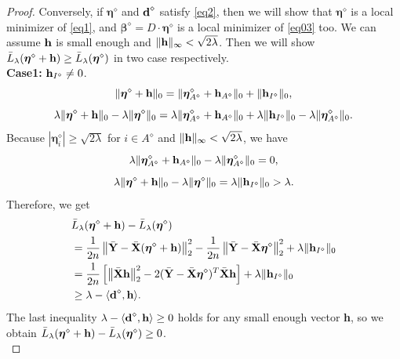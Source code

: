 \documentclass[12pt]{article}
\newcommand{\bX}{{\bf X}}
\newcommand{\bh}{\mbox{\bf h}}
\newcommand{\bd}{\mbox{\bf d}}
\newcommand{\bY}{\mbox{\bf Y}}
\newcommand{\bbeta}{\boldsymbol{\beta}}
\newcommand{\boldeta}{\boldsymbol{\eta}}
\begin{document}
\begin{appendix}
\begin{proof}
Conversely, if $\boldeta^{\diamond}$ and $\bd^{\diamond}$ satisfy \eqref{eq2}, then we will show that $\boldeta^{\diamond}$ is a local minimizer of \eqref{eq1}, and $\bbeta^{\diamond}=D\cdot\boldeta^{\diamond}$ is a local minimizer of \eqref{eq03} too.
We can assume $\bh$ is small enough and $\|\bh\|_{\infty}<\sqrt{2\lambda}$. Then we will show $\bar{L}_{\lambda}(\boldeta^{\diamond}+\bh)\geq \bar{L}_{\lambda}(\boldeta^{\diamond})$ in two case respectively.\\
\textbf{Case1:} $\bh_{I^{\diamond}}\neq0$.
\begin{equation*}
\|\boldeta^{\diamond}+\bh\|_{0}=\|\boldeta_{A^\diamond}^{\diamond}+\bh_{A^\diamond}\|_{0}+\|\bh_{I^\diamond}\|_{0},
\end{equation*}
\begin{equation*}
\lambda\|\boldeta^{\diamond}+\bh\|_{0}-\lambda\|\boldeta^{\diamond}\|_{0}=\lambda\|\boldeta_{A^\diamond}^{\diamond}+\bh_{A^\diamond}\|_{0}+\lambda\|\bh_{I^\diamond}\|_{0}-\lambda\|\boldeta_{A^\diamond}^{\diamond}\|_{0}.
\end{equation*}
Because $|\boldeta^{\diamond}_{i}|\geq\sqrt{2\lambda}$  for  $i\in{A^\diamond}$  and  $\|\bh\|_{\infty}<\sqrt{2\lambda}$, we have \begin{equation*}
\lambda\|\boldeta_{A^\diamond}^{\diamond}+\bh_{A^\diamond}\|_{0}-\lambda\|\boldeta_{A^\diamond}^{\diamond}\|_{0}=0,
\end{equation*}
\begin{equation*}
\lambda\|\boldeta^{\diamond}+\bh\|_{0}-\lambda\|\boldeta^{\diamond}\|_{0}=\lambda\|\bh_{I^\diamond}\|_{0}>\lambda.
\end{equation*}
Therefore, we get
\begin{equation*}
\begin{split}
&\bar{L}_{\lambda}(\boldeta^{\diamond}+\bh)-\bar{L}_{\lambda}(\boldeta^{\diamond})\\
&=\frac{1}{2n}\left\|\bar{\bY}-\bar{\bX}(\boldeta^{\diamond}+\bh)\right\|_2^2-\frac{1}{2n}\left\|\bar{\bY}-\bar{\bX}\boldeta^{\diamond}\right\|_2^2
+\lambda\|\bh_{I^\diamond}\|_{0}\\
&=\frac{1}{2n}\left[\left\|\bar{\bX}\bh\right\|_2^2-2(\bar{\bY}-\bar{\bX}\boldeta^{\diamond})^{T}\bar{\bX}\bh\right]+\lambda\|\bh_{I^\diamond}\|_{0}\\
&\geq \lambda-\langle \bd^{\diamond},\bh\rangle.
\end{split}
\end{equation*}
The last inequality $\lambda-\langle \bd^{\diamond},\bh\rangle\geq0$ holds for any small enough vector \bh, so we obtain $\bar{L}_{\lambda}(\boldeta^{\diamond}+\bh)-\bar{L}_{\lambda}(\boldeta^{\diamond})\geq0$.\\

\end{proof}
\end{appendix}
\end{document}
